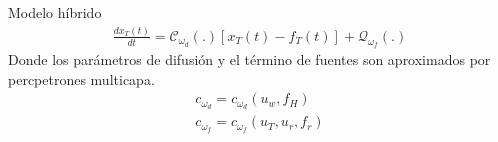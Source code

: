         \begin{model}{Modelo híbrido}{}
            \begin{gather}
                \frac{dx_{T}(t)}{dt} = \mathcal{C}_{\omega_d}(.)[x_{T}(t) - f_{T}(t)] + \mathcal{Q}_{\omega_f}(.) 
            \end{gather}
            Donde los parámetros de difusión y el término de fuentes son aproximados por percpetrones multicapa.
            \begin{gather}
                c_{\omega_d} = c_{\omega_d}(u_w,f_H) \\
                c_{\omega_f} =  c_{\omega_f}(u_T,u_r,f_r)
            \end{gather}
            \end{model}
    
            